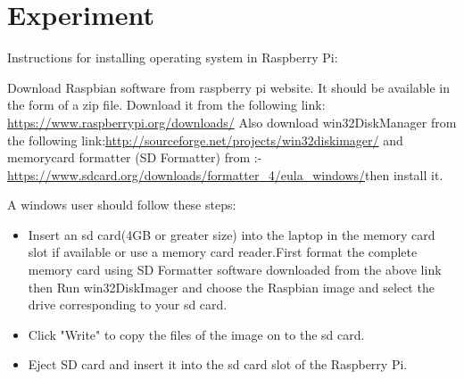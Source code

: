 \documentclass[11pt,a4paper]{report}
\begin{document}
	\section{Experiment}
	
	Instructions for installing operating system in Raspberry Pi:
	
	Download Raspbian software from raspberry pi website. It should be available in the form of a zip file. Download it from the following link: \url{https://www.raspberrypi.org/downloads/} Also download win32DiskManager from the following link:\url{http://sourceforge.net/projects/win32diskimager/} and memorycard formatter (SD Formatter) from :-\url{https://www.sdcard.org/downloads/formatter_4/eula_windows/}then install it.
	
	\vspace{0.5cm}
	A windows user should follow these steps:
	\begin{itemize}
		\item Insert an sd card(4GB or greater size) into the laptop in the memory card slot if available or use a memory card reader.First format the complete memory card using SD Formatter software downloaded from the above link then Run win32DiskImager and choose the Raspbian image and select the drive corresponding to your sd card.
		\item Click "Write" to copy the files of the image on to the sd card.
		\item Eject SD card and insert it into the sd card slot of the Raspberry Pi.
	\end{itemize}
	
\end{document}
